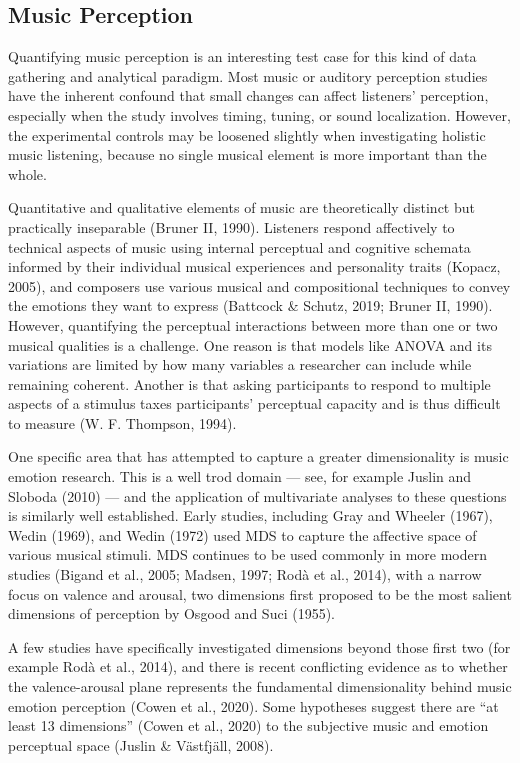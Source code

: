 \documentclass[
  english,
  man,floatsintext]{apa6}
\begin{document}
\hypertarget{music-perception}{%
\subsection{Music Perception}\label{music-perception}}

Quantifying music perception is an interesting test case for this kind of data gathering and analytical paradigm. Most music or auditory perception studies have the inherent confound that small changes can affect listeners' perception, especially when the study involves timing, tuning, or sound localization. However, the experimental controls may be loosened slightly when investigating holistic music listening, because no single musical element is more important than the whole.

Quantitative and qualitative elements of music are theoretically distinct but practically inseparable (Bruner II, 1990). Listeners respond affectively to technical aspects of music using internal perceptual and cognitive schemata informed by their individual musical experiences and personality traits (Kopacz, 2005), and composers use various musical and compositional techniques to convey the emotions they want to express (Battcock \& Schutz, 2019; Bruner II, 1990). However, quantifying the perceptual interactions between more than one or two musical qualities is a challenge. One reason is that models like ANOVA and its variations are limited by how many variables a researcher can include while remaining coherent. Another is that asking participants to respond to multiple aspects of a stimulus taxes participants' perceptual capacity and is thus difficult to measure (W. F. Thompson, 1994).

One specific area that has attempted to capture a greater dimensionality is music emotion research. This is a well trod domain --- see, for example Juslin and Sloboda (2010) --- and the application of multivariate analyses to these questions is similarly well established. Early studies, including Gray and Wheeler (1967), Wedin (1969), and Wedin (1972) used MDS to capture the affective space of various musical stimuli. MDS continues to be used commonly in more modern studies (Bigand et al., 2005; Madsen, 1997; Rodà et al., 2014), with a narrow focus on valence and arousal, two dimensions first proposed to be the most salient dimensions of perception by Osgood and Suci (1955).

A few studies have specifically investigated dimensions beyond those first two (for example Rodà et al., 2014), and there is recent conflicting evidence as to whether the valence-arousal plane represents the fundamental dimensionality behind music emotion perception (Cowen et al., 2020). Some hypotheses suggest there are ``at least 13 dimensions'' (Cowen et al., 2020) to the subjective music and emotion perceptual space (Juslin \& Västfjäll, 2008).
\end{document}
